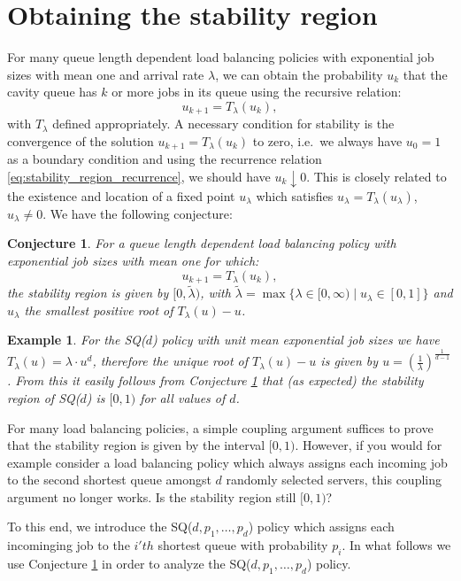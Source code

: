 \documentclass[12pt]{report}
\newtheorem{conjecture}{Conjecture}
\newtheorem{vbd}[theorem]{Example}
\begin{document}
\section{Obtaining the stability region} \label{sec:stability_region}
For many queue length dependent load balancing policies with exponential job sizes with mean one and arrival rate $\lambda$, we can obtain the probability $u_k$ that the cavity queue has $k$ or more jobs in its queue using the recursive relation:
\begin{equation} \label{eq:stability_region_recurrence}
	u_{k+1} = T_\lambda(u_k),
\end{equation}
with $T_\lambda$ defined appropriately. A necessary condition for stability is the convergence of the solution $u_{k+1} = T_\lambda(u_k)$ to zero, i.e.~we always have $u_0=1$ as a boundary condition and using the recurrence relation \eqref{eq:stability_region_recurrence}, we should have $u_k \downarrow 0$. This is closely related to the existence and location of a fixed point $u_\lambda$ which satisfies $u_\lambda = T_\lambda(u_\lambda)$, $u_\lambda \neq 0$. We have the following conjecture:
\begin{conjecture}\label{conj:open_stability}
For a queue length dependent load balancing policy with exponential job sizes with mean one for which: 
$$
u_{k+1} = T_\lambda(u_k),
$$
the stability region is given by $[0,\tilde \lambda)$, with $\tilde \lambda = \max\{\lambda \in [0,\infty) \mid u_\lambda \in [0,1] \}$ and $u_\lambda$ the smallest positive root of $T_\lambda(u)-u$.
\end{conjecture}
\begin{vbd}
	For the SQ($d$) policy with unit mean exponential job sizes we have $T_\lambda(u) = \lambda \cdot u^d$, therefore the unique root of $T_\lambda(u)-u$ is given by $u = \left(\frac{1}{\lambda}\right)^{\frac{1}{d-1}}$. From this it easily follows from Conjecture \ref{conj:open_stability} that (as expected) the stability region of SQ($d$) is $[0,1)$ for all values of $d$.
\end{vbd}
For many load balancing policies, a simple coupling argument suffices to prove that the stability region is given by the interval $[0,1)$. However, if you would for example consider a load balancing policy which always assigns each incoming job to the second shortest queue amongst $d$ randomly selected servers, this coupling argument no longer works. Is the stability region still $[0,1)$?

To this end, we introduce the SQ($d,p_1,\dots,p_d$) policy which assigns each incominging job to the $i'th$ shortest queue with probability $p_i$. In what follows we use Conjecture \ref{conj:open_stability} in order to analyze the SQ($d,p_1,\dots,p_d$) policy.
\end{document}
